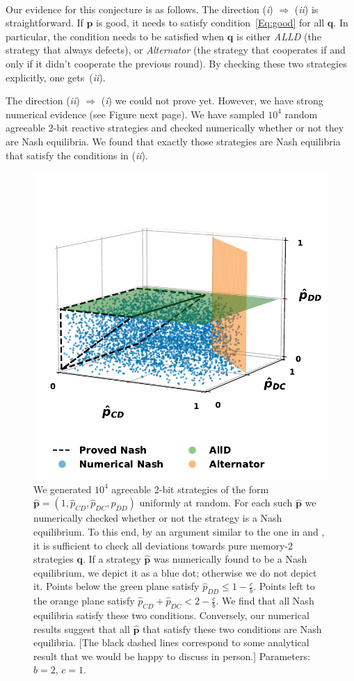 \documentclass{article}
\theoremstyle{definition}
\begin{document}
~\\
Our evidence for this conjecture is as follows. The direction ({\it i}) $\Rightarrow$ ({\it ii}) is straightforward. If $\mathbf{p}$ is good, it needs to satisfy condition~\eqref{Eq:good} for all $\mathbf{q}$. In particular, the condition needs to be satisfied when $\mathbf{q}$ is either \emph{ALLD} (the strategy that always defects), or \emph{Alternator} (the strategy that cooperates if and only if it didn't cooperate the previous round). By checking these two strategies explicitly, one gets~({\it ii}). 

The direction  ({\it ii}) $\Rightarrow$ ({\it i}) we could not prove yet. However, we have strong numerical evidence (see Figure next page). We have sampled $10^4$ random agreeable 2-bit reactive strategies and checked numerically whether or not they are Nash equilibria. We found that exactly those strategies are Nash equilibria that satisfy the conditions in ({\it ii}).


\begin{figure}[t]
  \centering
  \includegraphics[width=.5\textwidth]{static/for_akin.pdf}
  \caption{We generated $10^4$ agreeable 2-bit strategies of the form $\mathbf{\hat{p}}=(1,\hat{p}_{CD},\hat{p}_{DC},\hat{p}_{DD})$ uniformly at random. 
  For each such $\mathbf{\hat{p}}$ we numerically checked whether or not the strategy is a Nash equilibrium. 
  To this end, by an argument similar to the one in \citep{press:PNAS:2012} and  \citep{mcavoy:PRSA:2019}, it is sufficient to check all deviations towards pure memory-2 strategies $\mathbf{q}$.
  If a strategy $\mathbf{\hat{p}}$ was numerically found to be a Nash equilibrium, we depict it as a blue dot; otherwise we do not depict it. 
  Points below the green plane satisfy $\hat{p}_{DD} \leq 1\!-\! \frac{c}{b}$. 
  Points left to the orange plane satisfy $\hat{p}_{CD} + \hat{p}_{DC} < 2-\frac{c}{b}$.
  We find that all Nash equilibria satisfy these two conditions. 
  Conversely, our numerical results suggest that all $\mathbf{\hat{p}}$ that satisfy these two conditions are Nash equilibria.
  [The black dashed lines correspond to some analytical result that we would be happy to discuss in person.] Parameters: $b\!=\!2$, $c\!=\!1$.
  }
\end{figure}

~\\

\end{document}
